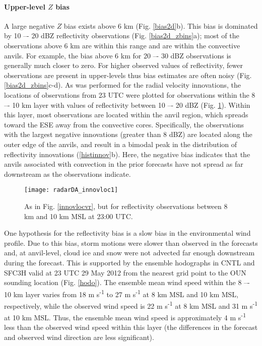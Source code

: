 \paragraph{Upper-level \(Z\) bias}
A large negative \(Z\) bias exists above 6 km (Fig. \ref{bias2d}b). This bias is dominated by 10 –- 20 dBZ reflectivity observations (Fig. \ref{bias2d_zbins}a); most of the observations above 6 km are within this range and are within the convective anvils. For example, the bias above 6 km for 20 –- 30 dBZ observations is generally much closer to zero. For higher observed values of reflectivity, fewer observations are present in upper-levels thus bias estimates are often noisy (Fig. \ref{bias2d_zbins}c-d). As was performed for the radial velocity innovations, the locations of observations from 23 UTC were plotted for observations within the 8 –- 10 km layer with values of reflectivity between 10 –- 20 dBZ (Fig. \ref{vrinnov}). Within this layer, most observations are located within the anvil region, which spreads toward the ESE away from the convective cores. Specifically, the observations with the largest negative innovations (greater than 8 dBZ) are located along the outer edge of the anvils, and result in a bimodal peak in the distribution of reflectivity innovations (\ref{histinnov}b). Here, the negative bias indicates that the anvils associated with convection in the prior forecasts have not spread as far downstream as the observations indicate.

\begin{figure}
\centering
\texttt{[image: radarDA\_innovloc1]}
\caption{As in Fig. \ref{innovlocvr}, but for reflectivity observations between 8 km and 10 km MSL at 23:00 UTC.}
\label{vrinnov}
\end{figure}

One hypothesis for the reflectivity bias is a slow bias in the environmental wind profile. Due to this bias, storm motions were slower than observed in the forecasts and, at anvil-level, cloud ice and snow were not advected far enough downstream during the forecast. This is supported by the ensemble hodographs in CNTL and SFC3H valid at 23 UTC 29 May 2012 from the nearest grid point to the OUN sounding location (Fig. \ref{hodo}). The ensemble mean wind speed within the 8 –- 10 km layer varies from 18 m s\textsuperscript{-1} to 27 m s\textsuperscript{-1} at 8 km MSL and 10 km MSL, respectively, while the observed wind speed is 22 m s\textsuperscript{-1} at 8 km MSL and 31 m s\textsuperscript{-1} at 10 km MSL. Thus, the ensemble mean wind speed is approximately 4 m s\textsuperscript{-1} less than the observed wind speed within this layer (the differences in the forecast and observed wind direction are less significant). 

